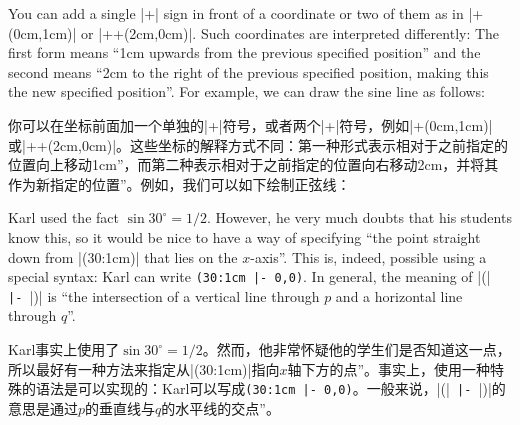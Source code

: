 





You can add a single |+| sign in front of a coordinate or two of them as in
|+(0cm,1cm)| or |++(2cm,0cm)|. Such coordinates are interpreted differently:
The first form means ``1cm upwards from the previous specified position'' and
the second means ``2cm to the right of the previous specified position, making
this the new specified position''. For example, we can draw the sine line as
follows:
%

你可以在坐标前面加一个单独的|+|符号，或者两个|+|符号，例如|+(0cm,1cm)|或|++(2cm,0cm)|。这些坐标的解释方式不同：第一种形式表示相对于之前指定的位置向上移动1cm''，而第二种表示相对于之前指定的位置向右移动2cm，并将其作为新指定的位置''。例如，我们可以如下绘制正弦线：

\begin{codeexample}[]
\end{codeexample}

Karl used the fact $\sin 30^\circ = 1/2$. However, he very much doubts that his
students know this, so it would be nice to have a way of specifying ``the point
straight down from |(30:1cm)| that lies on the $x$-axis''. This is, indeed,
possible using a special syntax: Karl can write \verb!(30:1cm |- 0,0)!. In
general, the meaning of |(|\verb! |- !|)| is ``the intersection
of a vertical line through $p$ and a horizontal line through $q$''.

Karl事实上使用了$\sin 30^\circ = 1/2$。然而，他非常怀疑他的学生们是否知道这一点，所以最好有一种方法来指定从|(30:1cm)|指向$x$轴下方的点''。事实上，使用一种特殊的语法是可以实现的：Karl可以写成\verb!(30:1cm |- 0,0)!。一般来说，|(|\verb! |- !|)|的意思是通过$p$的垂直线与$q$的水平线的交点''。

